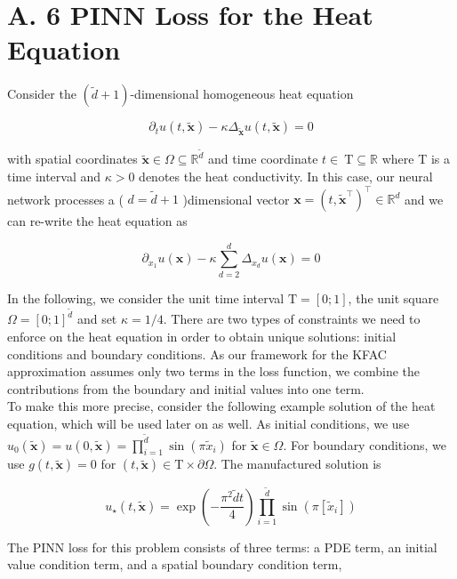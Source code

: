 \documentclass[10pt]{article}
\begin{document}
\section*{A. 6 PINN Loss for the Heat Equation}
Consider the $(\tilde{d}+1)$-dimensional homogeneous heat equation

$$
\partial_{t} u(t, \tilde{\boldsymbol{x}})-\kappa \Delta_{\tilde{\boldsymbol{x}}} u(t, \tilde{\boldsymbol{x}})=0
$$

with spatial coordinates $\tilde{\boldsymbol{x}} \in \Omega \subseteq \mathbb{R}^{\tilde{d}}$ and time coordinate $t \in \mathrm{~T} \subseteq \mathbb{R}$ where T is a time interval and $\kappa>0$ denotes the heat conductivity. In this case, our neural network processes a ( $d=\tilde{d}+1$ )dimensional vector $\boldsymbol{x}=\left(t, \tilde{\boldsymbol{x}}^{\top}\right)^{\top} \in \mathbb{R}^{d}$ and we can re-write the heat equation as

$$
\partial_{x_{1}} u(\boldsymbol{x})-\kappa \sum_{d=2}^{d} \Delta_{x_{d}} u(\boldsymbol{x})=0
$$

In the following, we consider the unit time interval $\mathrm{T}=[0 ; 1]$, the unit square $\Omega=[0 ; 1]^{\tilde{d}}$ and set $\kappa=1 / 4$. There are two types of constraints we need to enforce on the heat equation in order to obtain unique solutions: initial conditions and boundary conditions. As our framework for the KFAC approximation assumes only two terms in the loss function, we combine the contributions from the boundary and initial values into one term.\\
To make this more precise, consider the following example solution of the heat equation, which will be used later on as well. As initial conditions, we use $u_{0}(\tilde{\boldsymbol{x}})=u(0, \tilde{\boldsymbol{x}})=\prod_{i=1}^{\tilde{d}} \sin \left(\pi \tilde{x}_{i}\right)$ for $\tilde{\boldsymbol{x}} \in \Omega$. For boundary conditions, we use $g(t, \tilde{\boldsymbol{x}})=0$ for $(t, \tilde{\boldsymbol{x}}) \in \mathrm{T} \times \partial \Omega$. The manufactured solution is

$$
u_{\star}(t, \tilde{\boldsymbol{x}})=\exp \left(-\frac{\pi^{2} \tilde{d} t}{4}\right) \prod_{i=1}^{\tilde{d}} \sin \left(\pi\left[\tilde{x}_{i}\right]\right)
$$

The PINN loss for this problem consists of three terms: a PDE term, an initial value condition term, and a spatial boundary condition term,
\end{document}

